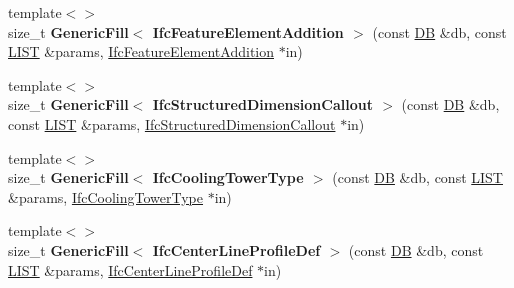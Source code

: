 \begin{DoxyCompactItemize}
\item 
\hypertarget{namespace_assimp_1_1_s_t_e_p_ac86bb34cc3f6181e2c2531ccbbcc9e8c}{{\footnotesize template$<$$>$ }\\size\+\_\+t {\bfseries Generic\+Fill$<$ Ifc\+Feature\+Element\+Addition $>$} (const \hyperlink{class_assimp_1_1_s_t_e_p_1_1_d_b}{D\+B} \&db, const \hyperlink{class_assimp_1_1_s_t_e_p_1_1_e_x_p_r_e_s_s_1_1_l_i_s_t}{L\+I\+S\+T} \&params, \hyperlink{struct_assimp_1_1_i_f_c_1_1_ifc_feature_element_addition}{Ifc\+Feature\+Element\+Addition} $\ast$in)}\label{namespace_assimp_1_1_s_t_e_p_ac86bb34cc3f6181e2c2531ccbbcc9e8c}

\item 
\hypertarget{namespace_assimp_1_1_s_t_e_p_a3d5aa095b8534f5d63af33d701e47b29}{{\footnotesize template$<$$>$ }\\size\+\_\+t {\bfseries Generic\+Fill$<$ Ifc\+Structured\+Dimension\+Callout $>$} (const \hyperlink{class_assimp_1_1_s_t_e_p_1_1_d_b}{D\+B} \&db, const \hyperlink{class_assimp_1_1_s_t_e_p_1_1_e_x_p_r_e_s_s_1_1_l_i_s_t}{L\+I\+S\+T} \&params, \hyperlink{struct_assimp_1_1_i_f_c_1_1_ifc_structured_dimension_callout}{Ifc\+Structured\+Dimension\+Callout} $\ast$in)}\label{namespace_assimp_1_1_s_t_e_p_a3d5aa095b8534f5d63af33d701e47b29}

\item 
\hypertarget{namespace_assimp_1_1_s_t_e_p_a095627a17a816547227820c5dcdf949e}{{\footnotesize template$<$$>$ }\\size\+\_\+t {\bfseries Generic\+Fill$<$ Ifc\+Cooling\+Tower\+Type $>$} (const \hyperlink{class_assimp_1_1_s_t_e_p_1_1_d_b}{D\+B} \&db, const \hyperlink{class_assimp_1_1_s_t_e_p_1_1_e_x_p_r_e_s_s_1_1_l_i_s_t}{L\+I\+S\+T} \&params, \hyperlink{struct_assimp_1_1_i_f_c_1_1_ifc_cooling_tower_type}{Ifc\+Cooling\+Tower\+Type} $\ast$in)}\label{namespace_assimp_1_1_s_t_e_p_a095627a17a816547227820c5dcdf949e}

\item 
\hypertarget{namespace_assimp_1_1_s_t_e_p_ad4065b956c5d7b2fc4b35fa0d491b6cc}{{\footnotesize template$<$$>$ }\\size\+\_\+t {\bfseries Generic\+Fill$<$ Ifc\+Center\+Line\+Profile\+Def $>$} (const \hyperlink{class_assimp_1_1_s_t_e_p_1_1_d_b}{D\+B} \&db, const \hyperlink{class_assimp_1_1_s_t_e_p_1_1_e_x_p_r_e_s_s_1_1_l_i_s_t}{L\+I\+S\+T} \&params, \hyperlink{struct_assimp_1_1_i_f_c_1_1_ifc_center_line_profile_def}{Ifc\+Center\+Line\+Profile\+Def} $\ast$in)}\label{namespace_assimp_1_1_s_t_e_p_ad4065b956c5d7b2fc4b35fa0d491b6cc}


\end{DoxyCompactItemize}
